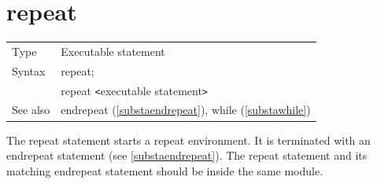 
\section{repeat}
\label{substarepeat}

\noindent \begin{tabular}{ll}
Type & Executable statement\\
Syntax & repeat; \\
       & repeat {\tt<}executable statement{\tt>}
\\ See also & endrepeat (\ref{substaendrepeat}), while (\ref{substawhile})
\end{tabular} \vspace{4mm}

\noindent The repeat statement starts a
repeat environment. It is terminated with an 
endrepeat statement (see \ref{substaendrepeat}). The 
repeat statement and its matching endrepeat statement should be inside the 
same module. \vspace{4mm}

